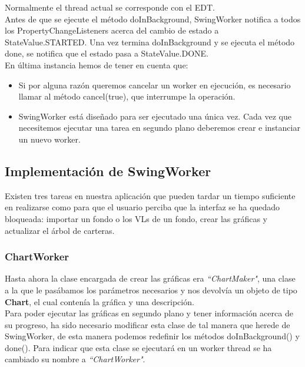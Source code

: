 \documentclass[12pt, a4paper]{book}
\begin{document}
Normalmente el thread actual se corresponde con el \gls{EDT}.\\

Antes de que se ejecute el método doInBackground, SwingWorker notifica a todos los PropertyChangeListeners acerca del cambio de estado a StateValue.STARTED. Una vez termina doInBackground y se ejecuta el método done, se notifica que el estado pasa a StateValue.DONE.\\

En última instancia hemos de tener en cuenta que:

\begin{itemize}
	\item Si por alguna razón queremos cancelar un worker en ejecución, es necesario llamar al método cancel(true), que interrumpe la operación.
	\item SwingWorker está diseñado para ser ejecutado una única vez. Cada vez que necesitemos ejecutar una tarea en segundo plano deberemos crear e instanciar un nuevo worker.
\end{itemize}


\newpage

\subsection{Implementación de SwingWorker}

Existen tres tareas en nuestra aplicación que pueden tardar un tiempo suficiente en realizarse como para que el usuario perciba que la interfaz se ha quedado bloqueada: importar un fondo o los \gls{VL}s de un fondo, crear las gráficas y actualizar el árbol de carteras.

\subsubsection{ChartWorker}

Hasta ahora la clase encargada de crear las gráficas era \textit{``ChartMaker"}, una clase a la que le pasábamos los parámetros necesarios y nos devolvía un objeto de tipo \textbf{Chart}, el cual contenía la gráfica y una descripción.\\

Para poder ejecutar las gráficas en segundo plano y tener información acerca de su progreso, ha sido necesario modificar esta clase de tal manera que herede de SwingWorker, de esta manera podemos redefinir los métodos doInBackground() y done(). Para indicar que esta clase se ejecutará en un worker thread se ha cambiado su nombre a \textit{``ChartWorker"}. \\
\end{document}
